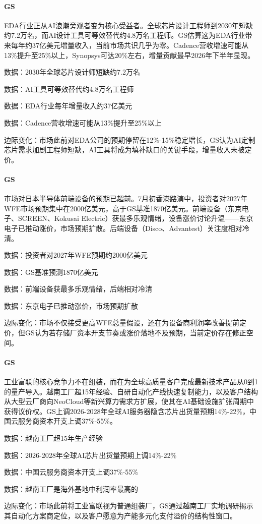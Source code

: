 \documentclass[11pt]{ctexart}
\begin{document}
\paragraph{GS} EDA行业正从AI浪潮旁观者变为核心受益者。全球芯片设计工程师到2030年短缺约7.2万名，而AI设计工具可等效替代约4.8万名工程师。GS估算这为EDA行业带来每年约37亿美元增量收入，当前市场共识几乎为零。Cadence营收增速可能从13\%提升至25\%以上，Synopsys可达20\%左右，增量贡献最早2026年下半年显现。
{\small\color{refgray}数据：2030年全球芯片设计师短缺约7.2万名\par}
{\small\color{refgray}数据：AI工具可等效替代约4.8万名工程师\par}
{\small\color{refgray}数据：EDA行业每年增量收入约37亿美元\par}
{\small\color{refgray}数据：Cadence营收增速可能从13\%提升至25\%以上\par}
{\small\color{refgray}边际变化：市场此前对EDA公司的预期停留在12\%-15\%稳定增长，GS认为AI定制芯片需求加剧工程师短缺，AI工具将成为填补缺口的关键手段，增量收入未被定价。\par}
\paragraph{GS} 市场对日本半导体前端设备的预期已超前。7月初香港路演中，投资者对2027年WFE市场预期集中在2000亿美元，高于GS基准1870亿美元。前端设备（东京电子、SCREEN、Kokusai Electric）获最多乐观情绪，设备涨价讨论升温——东京电子已推动涨价，市场预期扩散。后端设备（Disco、Advantest）关注度相对冷清。
{\small\color{refgray}数据：投资者对2027年WFE预期约2000亿美元\par}
{\small\color{refgray}数据：GS基准预测1870亿美元\par}
{\small\color{refgray}数据：前端设备获最多乐观情绪，后端相对冷清\par}
{\small\color{refgray}数据：东京电子已推动涨价，市场预期扩散\par}
{\small\color{refgray}边际变化：市场不仅接受更高WFE总量假设，还在为设备商利润率改善提前定价，但GS认为若存储厂资本开支节奏或涨价落地不及预期，当前定价存在修正空间。\par}
\paragraph{GS} 工业富联的核心竞争力不在组装，而在为全球高质量客户完成最新技术产品从0到1的量产导入。越南工厂超15年经验、自研自动化产线快速复制能力，以及客户结构从大型云厂商向NeoCloud等新兴算力需求方扩展，使其在AI基础设施扩张周期中获得议价权。GS上调2026-2028年全球AI服务器隐含芯片出货量预期14\%-22\%，中国云服务商资本开支上调37\%-55\%。
{\small\color{refgray}数据：越南工厂超15年生产经验\par}
{\small\color{refgray}数据：2026-2028年全球AI芯片出货量预期上调14\%-22\%\par}
{\small\color{refgray}数据：中国云服务商资本开支上调37\%-55\%\par}
{\small\color{refgray}数据：越南工厂是海外基地中利润率最高的\par}
{\small\color{refgray}边际变化：市场此前将工业富联视为普通组装厂，GS通过越南工厂实地调研揭示其自动化方案商定位，以及客户愿意为产能多元化支付溢价的结构性窗口。\par}
\end{document}
